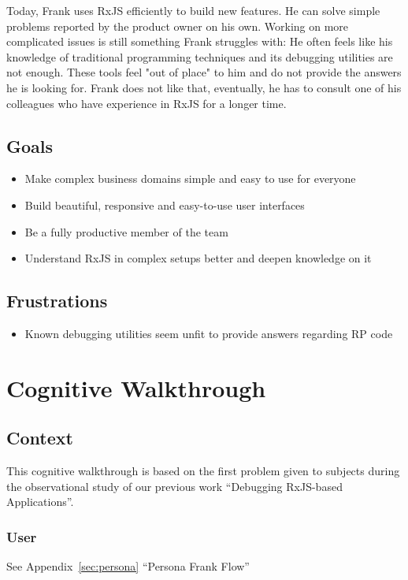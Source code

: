 \documentclass[sigplan,screen,nonacm,review]{acmart}
\begin{document}
Today, Frank uses RxJS efficiently to build new features. He can solve simple problems reported by the product owner on his own. Working on more complicated issues is still something Frank struggles with: He often feels like his knowledge of traditional programming techniques and its debugging utilities are not enough. These tools feel "out of place" to him and do not provide the answers he is looking for. Frank does not like that, eventually, he has to consult one of his colleagues who have experience in RxJS for a longer time.

\subsection{Goals}
\begin{itemize}
	\item Make complex business domains simple and easy to use for everyone
	\item Build beautiful, responsive and easy-to-use user interfaces
	\item Be a fully productive member of the team
	\item Understand RxJS in complex setups better and deepen knowledge on it
\end{itemize}

\subsection{Frustrations}
\begin{itemize}
	\item Known debugging utilities seem unfit to provide answers regarding RP code
\end{itemize}


\section{Cognitive Walkthrough}
\label{sec:cogitive-walkthrough-appendix}

\subsection{Context}

This cognitive walkthrough is based on the first problem given to subjects during the observational study of our previous work ``Debugging RxJS-based Applications''\cite{TODO}.

\subsubsection{User}
See Appendix~\ref{sec:persona} ``Persona Frank Flow''
\end{document}
